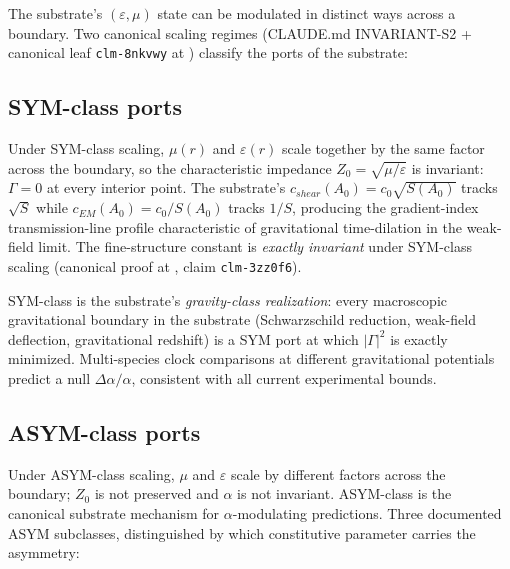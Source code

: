 The substrate's $(\varepsilon, \mu)$ state can be modulated in distinct ways across a boundary. Two canonical scaling regimes (CLAUDE.md INVARIANT-S2 + canonical leaf \texttt{clm-8nkvwy} at ) classify the ports of the substrate:

\subsection{SYM-class ports}

Under SYM-class scaling, $\mu(r)$ and $\varepsilon(r)$ scale together by the same factor across the boundary, so the characteristic impedance $Z_0 = \sqrt{\mu/\varepsilon}$ is invariant: $\Gamma = 0$ at every interior point. The substrate's $c_{shear}(A_0) = c_0\sqrt{S(A_0)}$ tracks $\sqrt{S}$ while $c_{EM}(A_0) = c_0/S(A_0)$ tracks $1/S$, producing the gradient-index transmission-line profile characteristic of gravitational time-dilation in the weak-field limit. The fine-structure constant is \emph{exactly invariant} under SYM-class scaling (canonical proof at , claim \texttt{clm-3zz0f6}).

SYM-class is the substrate's \emph{gravity-class realization}: every macroscopic gravitational boundary in the substrate (Schwarzschild reduction, weak-field deflection, gravitational redshift) is a SYM port at which $|\Gamma|^2$ is exactly minimized. Multi-species clock comparisons at different gravitational potentials predict a null $\Delta\alpha/\alpha$, consistent with all current experimental bounds.

\subsection{ASYM-class ports}

Under ASYM-class scaling, $\mu$ and $\varepsilon$ scale by different factors across the boundary; $Z_0$ is not preserved and $\alpha$ is not invariant. ASYM-class is the canonical substrate mechanism for $\alpha$-modulating predictions. Three documented ASYM subclasses, distinguished by which constitutive parameter carries the asymmetry:

